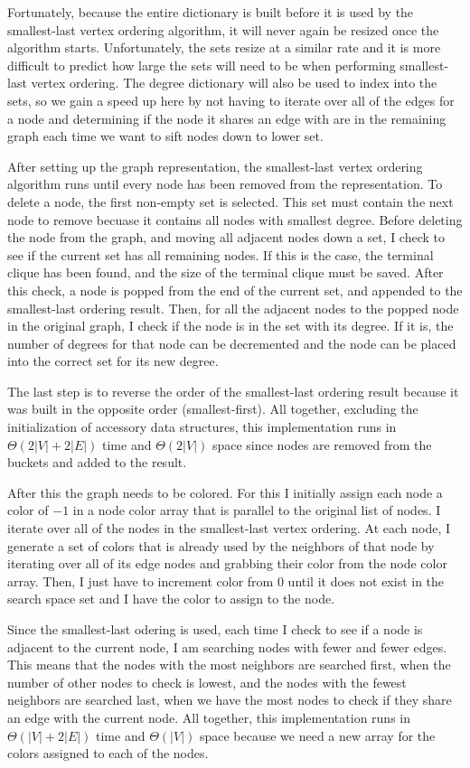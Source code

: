 \documentclass{article}
\begin{document}
        Fortunately, because the entire dictionary is built before it is used by the smallest-last vertex ordering algorithm, it will never again be resized once the algorithm starts. Unfortunately, the sets resize at a similar rate and it is more difficult to predict how large the sets will need to be when performing smallest-last vertex ordering. The degree dictionary will also be used to index into the sets, so we gain a speed up here by not having to iterate over all of the edges for a node and determining if the node it shares an edge with are in the remaining graph each time we want to sift nodes down to lower set.
        \par
        After setting up the graph representation, the smallest-last vertex ordering algorithm runs until every node has been removed from the representation. To delete a node, the first non-empty set is selected. This set must contain the next node to remove becuase it contains all nodes with smallest degree. Before deleting the node from the graph, and moving all adjacent nodes down a set, I check to see if the current set has all remaining nodes. If this is the case, the terminal clique has been found, and the size of the terminal clique must be saved. After this check, a node is popped from the end of the current set, and appended to the smallest-last ordering result. Then, for all the adjacent nodes to the popped node in the original graph, I check if the node is in the set with its degree. If it is, the number of degrees for that node can be decremented and the node can be placed into the correct set for its new degree.
        \par
        The last step is to reverse the order of the smallest-last ordering result because it was built in the opposite order (smallest-first). All together, excluding the initialization of accessory data structures, this implementation runs in $\Theta(2|V| + 2|E|)$ time and $\Theta(2|V|)$ space since nodes are removed from the buckets and added to the result.
        \par
        After this the graph needs to be colored. For this I initially assign each node a color of $-1$ in a node color array that is parallel to the original list of nodes. I iterate over all of the nodes in the smallest-last vertex ordering. At each node, I generate a set of colors that is already used by the neighbors of that node by iterating over all of its edge nodes and grabbing their color from the node color array. Then, I just have to increment color from $0$ until it does not exist in the search space set and I have the color to assign to the node.
        \par
        Since the smallest-last odering is used, each time I check to see if a node is adjacent to the current node, I am searching nodes with fewer and fewer edges. This means that the nodes with the most neighbors are searched first, when the number of other nodes to check is lowest, and the nodes with the fewest neighbors are searched last, when we have the most nodes to check if they share an edge with the current node. All together, this implementation runs in $\Theta(|V| + 2|E|)$ time and $\Theta(|V|)$ space because we need a new array for the colors assigned to each of the nodes.
\end{document}
